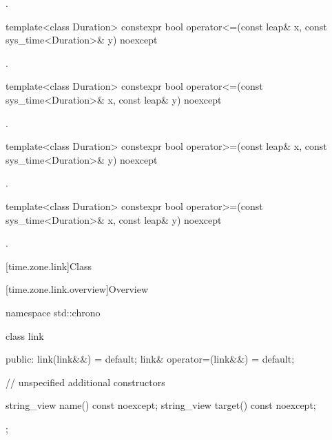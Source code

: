 \begin{itemdescr}
\pnum
\returns {}.
\end{itemdescr}

%
%
\begin{itemdecl}
template<class Duration>
  constexpr bool operator<=(const leap& x, const sys_time<Duration>& y) noexcept
\end{itemdecl}

\begin{itemdescr}
\pnum
\returns {}.
\end{itemdescr}

%
%
\begin{itemdecl}
template<class Duration>
  constexpr bool operator<=(const sys_time<Duration>& x, const leap& y) noexcept
\end{itemdecl}

\begin{itemdescr}
\pnum
\returns {}.
\end{itemdescr}

%
%
\begin{itemdecl}
template<class Duration>
  constexpr bool operator>=(const leap& x, const sys_time<Duration>& y) noexcept
\end{itemdecl}

\begin{itemdescr}
\pnum
\returns {}.
\end{itemdescr}

%
%
\begin{itemdecl}
template<class Duration>
  constexpr bool operator>=(const sys_time<Duration>& x, const leap& y) noexcept
\end{itemdecl}

\begin{itemdescr}
\pnum
\returns {}.
\end{itemdescr}

[time.zone.link]{Class }

[time.zone.link.overview]{Overview}

\begin{codeblock}
namespace std::chrono {
  class link {
  public:
    link(link&&)            = default;
    link& operator=(link&&) = default;

    // unspecified additional constructors

    string_view name()   const noexcept;
    string_view target() const noexcept;
  };
}
\end{codeblock}

